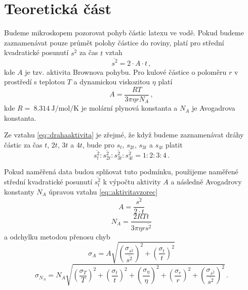 \section*{Teoretická část}
Budeme mikroskopem pozorovat pohyb částic latexu ve vodě.
Pokud budeme zaznamenávat pouze průmět polohy částice do roviny, platí pro střední kvadratické posunutí $\overline{s^2}$ za čas $t$ vztah \cite{skripta}
\begin{equation} \label{eq::drahaaktivita}
\overline{s^2}=2 \cdot A \cdot t \,,
\end{equation}
kde $A$ je tzv. aktivita Brownova pohybu.
Pro kulové částice o poloměru $r$ v prostředí s teplotou $T$ a dynamickou viskozitou $\eta$ platí \cite{skripta}
\begin{equation} \label{eq::aktivitavzorec}
A=\frac{RT}{3 \pi \eta r N_A} \,,
\end{equation}
kde $R=~\SI{8.314}{\joule \per \mole \per \kelvin}$ je molární plynová konstanta a $N_A$ je Avogadrova konstanta.

Ze vztahu \eqref{eq::drahaaktivita} je zřejmé, že když budeme zaznamenávat dráhy částic za čas $t$, $2t$, $3t$ a $4t$, bude pro $s_t$, $s_{2t}$, $s_{3t}$ a $s_{4t}$ platit
\begin{equation} \label{eq::pomerdrah1234}
\overline{s_t^2}:\overline{s_{2t}^2}:\overline{s_{3t}^2}:\overline{s_{4t}^2} = 1:2:3:4 \,.
\end{equation}

Pokud naměřená data budou splňovat tuto podmínku, použijeme naměřené střední kvadratické posunutí $\overline{s_t^2}$ k výpočtu aktivity $A$ a následně Avogadrovy konstanty $N_A$ úpravou vztahu \eqref{eq::aktivitavzorec}
\begin{equation} \label{eq::A}
A=\frac{\overline{s^2}}{2 \cdot t}
\end{equation}
\begin{equation} \label{eq::NA}
N_A=\frac{2RTt}{3\pi \eta r \overline{s^2}}
\end{equation}
a odchylku metodou přenosu chyb
\begin{equation} \label{eq::chybaA}
\sigma_A = A \sqrt{
\left( \frac{\sigma_{\overline{s^2}}}{\overline{s^2}}  \right)^2 +
\left( \frac{\sigma_t}{t}    \right)^2
}
\end{equation}
\begin{equation} \label{eq::chybaNA}
\sigma_{N_A}=N_A \sqrt{
\left( \frac{\sigma_T}{T} \right)^2  +
\left( \frac{\sigma_t}{t} \right)^2  +
\left( \frac{\sigma_\eta}{\eta} \right)^2  +
\left( \frac{\sigma_r}{r} \right)^2  +
\left( \frac{\sigma_{\overline{s^2}}}{\overline{s^2}} \right)^2
} \,.
\end{equation}